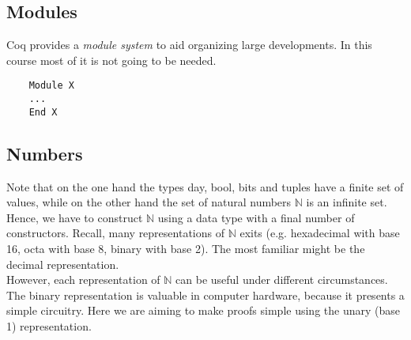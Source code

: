 \subsection{Modules}

	Coq provides a {\itshape module system} to aid organizing large developments.
	In this course most of it is not going to be needed.

	\begin{lstlisting}
	Module X 
	...
	End X
	\end{lstlisting}

\subsection{Numbers}

  Note that on the one hand the types day, bool, bits and tuples have a finite set of values, while on the other hand the set of natural numbers $\mathbb{N}$ is an infinite set.\\ 
  Hence, we have to construct $\mathbb{N}$ using a data type with a final number of constructors. 
  Recall, many representations of $\mathbb{N}$ exits (e.g. hexadecimal with base 16, octa with base 8, binary with base 2).
  The most familiar might be the decimal representation.\\
  However, each representation of $\mathbb{N}$ can be useful under different circumstances. 
  The binary representation is valuable in computer hardware, because it presents a simple circuitry.
  Here we are aiming to make proofs simple using the unary (base 1) representation.
  
